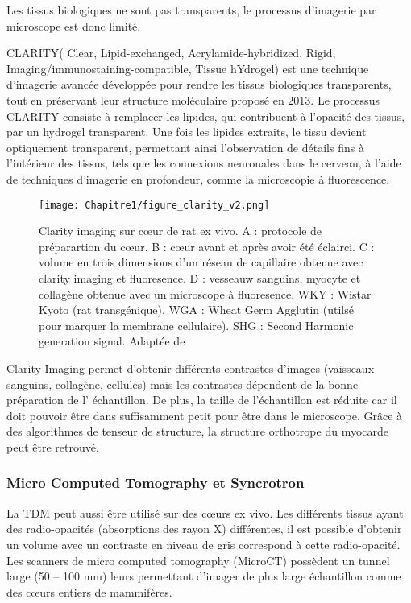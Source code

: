Les tissus biologiques ne sont pas transparents, le processus d’imagerie par microscope est donc limité.

CLARITY( Clear, Lipid-exchanged, Acrylamide-hybridized, Rigid, Imaging/immunostaining-compatible, Tissue hYdrogel) \cite{Du_2018} est une technique d'imagerie avancée développée pour rendre les tissus biologiques transparents, tout en préservant leur structure moléculaire proposé en 2013. Le processus CLARITY consiste à remplacer les lipides, qui contribuent à l'opacité des tissus, par un hydrogel transparent. Une fois les lipides extraits, le tissu devient optiquement transparent, permettant ainsi l'observation de détails fins à l'intérieur des tissus, tels que les connexions neuronales dans le cerveau, à l'aide de techniques d'imagerie en profondeur, comme la microscopie à fluorescence.

\begin{figure}[!htbp]
  \begin{center}
    \texttt{[image: Chapitre1/figure\_clarity\_v2.png]}
     \end{center}
    \caption{Clarity imaging sur cœur de rat ex vivo. A : protocole de préparartion du cœur. B : cœur avant et après avoir été éclairci. C : volume en trois dimensions d’un réseau de capillaire obtenue avec clarity imaging et fluoresence. D : vesseauw sanguins, myocyte et collagène obtenue avec un microscope à fluoresence. WKY : Wistar Kyoto (rat transgénique). WGA : Wheat Germ Agglutin (utilsé pour marquer la membrane cellulaire). SHG : Second Harmonic generation signal.  Adaptée de \cite{Olianti_2020}}
  \label{fig:clarity}
\end{figure}

Clarity Imaging permet d’obtenir différents contrastes d’images (vaisseaux sanguins, collagène, cellules) mais les contrastes dépendent de la bonne préparation de l’ échantillon. De plus, la taille de l’échantillon est réduite car il doit pouvoir être dans suffisamment petit pour être dans le microscope. Grâce à des algorithmes de tenseur de structure, la structure orthotrope du myocarde peut être retrouvé.
\clearpage
\subsubsection{Micro Computed Tomography et Syncrotron}

La TDM peut aussi être utilisé sur des cœurs ex vivo. Les différents tissus ayant des radio-opacités (absorptions des rayon X) différentes, il est possible d’obtenir un volume avec un contraste en niveau de gris correspond à cette radio-opacité. Les scanners de micro computed tomography (MicroCT) possèdent un tunnel large (50 – 100 mm) leurs permettant d’imager de plus large échantillon comme des cœurs entiers de mammifères.

